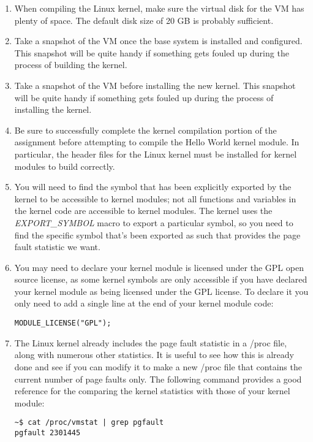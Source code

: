\documentclass[11pt]{article}
\begin{document}
\begin{enumerate}
\item When compiling the Linux kernel, make sure the virtual disk for the VM has plenty of space. The default disk size of 20 GB is probably sufficient.
\item Take a snapshot of the VM once the base system is installed and configured. This snapshot will be quite handy if something gets fouled up during the process of building the kernel.
\item Take a snapshot of the VM before installing the new kernel. This snapshot will be quite handy if something gets fouled up during the process of installing the kernel.
\item Be sure to successfully complete the kernel compilation portion of the assignment before attempting to compile the Hello World kernel module. In particular, the header files for the Linux kernel must be installed for kernel modules to build correctly.
\item You will need to find the symbol that has been explicitly exported by the kernel to be accessible to kernel modules; not all functions and variables in the kernel code are accessible to kernel modules. The kernel uses the \emph{EXPORT\_SYMBOL} macro to export a particular symbol, so you need to find the specific symbol that's been exported as such that provides the page fault statistic we want.
\item You may need to declare your kernel module is licensed under the GPL open source license, as some kernel symbols are only accessible if you have declared your kernel module as being licensed under the GPL license. To declare it you only need to add a single line at the end of your kernel module code\cite{gpl}:

\begin{verbatim}
MODULE_LICENSE("GPL");
\end{verbatim}
\item The Linux kernel already includes the page fault statistic in a /proc file, along with numerous other statistics. It is useful to see how this is already done and see if you can modify it to make a new /proc file that contains the current number of page faults only. The following command provides a good reference for the comparing the kernel statistics with those of your kernel module:

\begin{verbatim}
~$ cat /proc/vmstat | grep pgfault
pgfault 2301445
\end{verbatim}
\end{enumerate}
\end{document}
